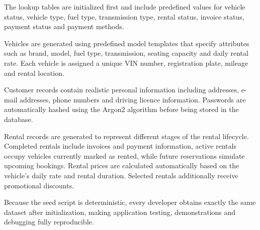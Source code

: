 The lookup tables are initialized first and include predefined values for vehicle status, vehicle type, fuel type, transmission type, rental status, invoice status, payment status and payment methods.

Vehicles are generated using predefined model templates that specify attributes such as brand, model, fuel type, transmission, seating capacity and daily rental rate. Each vehicle is assigned a unique VIN number, registration plate, mileage and rental location.

Customer records contain realistic personal information including addresses, e-mail addresses, phone numbers and driving licence information. Passwords are automatically hashed using the Argon2 algorithm before being stored in the database.

Rental records are generated to represent different stages of the rental lifecycle. Completed rentals include invoices and payment information, active rentals occupy vehicles currently marked as rented, while future reservations simulate upcoming bookings. Rental prices are calculated automatically based on the vehicle's daily rate and rental duration. Selected rentals additionally receive promotional discounts.

Because the seed script is deterministic, every developer obtains exactly the same dataset after initialization, making application testing, demonstrations and debugging fully reproducible.
